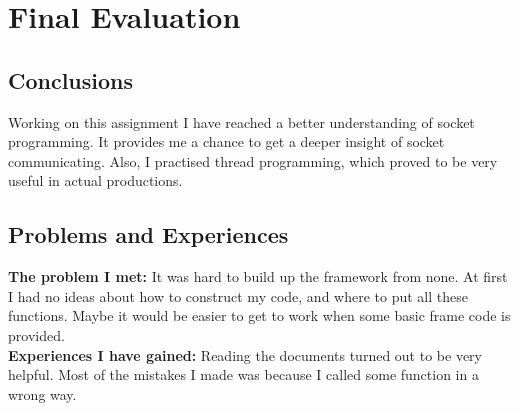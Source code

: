 \documentclass[a4paper, 11pt]{article}
\begin{document}
\section*{Final Evaluation}
\subsection*{Conclusions}
Working on this assignment I have reached a better understanding of socket programming. It provides me a chance to get a deeper insight of socket communicating. Also, I practised thread programming, which proved to be very useful in actual productions.

\subsection*{Problems and Experiences}
\textbf{The problem I met:} It was hard to build up the framework from none. At first I had no ideas about how to construct my code, and where to put all these functions. Maybe it would be easier to get to work when some basic frame code is provided.\\
\textbf{Experiences I have gained:} Reading the documents turned out to be very helpful. Most of the mistakes I made was because I called some function in a wrong way.
\end{document}
